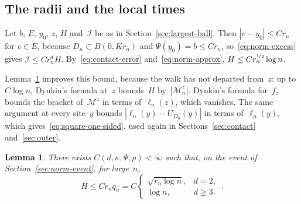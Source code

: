 \documentclass[11pt]{amsart}
\theoremstyle{plain}
\newtheorem{lemma}[theorem]{Lemma}
\theoremstyle{definition}
\newcommand{\drift}{\kappa}
\newcommand{\gauge}{\Psi}
\newcommand{\nf}{\nicefrac}
\numberwithin{equation}{section}
\begin{document}
\subsection{The radii and the local times}\label{sec:norm-inner}

Let $b$, $E$, $y_0$, $z$, $H$ and~$\mathcal I$ be as in Section~\ref{sec:largest-ball}. Then $|v-y_0|\leq Cr_n$ for $v\in E$, because $D_n\subset B(0,Kr_n)$ and $\gauge(y_0)=b\leq Cr_n$, so~\eqref{eq:norm-excess} gives $\mathcal I\leq Cr_n^dH$. By~\eqref{eq:contact-error} and~\eqref{eq:norm-approx}, $H\leq Cr_n^{\nf12}\log n$.

Lemma~\ref{lem:contact} improves this bound, because the walk has not departed from~$z$: up to $C\log n$, Dynkin's formula at~$z$ bounds~$H$ by~$|\mathcal M^z_n|$. Dynkin's formula for~$f_z$ bounds the bracket of~$\mathcal M^z$ in terms of~$\ell_n(z)$, which vanishes. The same argument at every site~$y$ bounds $|\ell_n(y)-U_{D_n}(y)|$ in terms of~$\ell_n(y)$, which gives~\eqref{eq:square-one-sided}, used again in Sections~\ref{sec:contact} and~\ref{sec:outer}.

\begin{lemma}\label{lem:contact}
There exists $C(d,\drift,\gauge,p)<\infty$ such that, on the event of Section~\ref{sec:norm-event}, for large~$n$,
\begin{equation*}
H\leq Cr_nq_n=C\begin{cases}\sqrt{r_n\log n},&d=2,\\\log n,&d\geq3\end{cases}\, .
\end{equation*}
\end{lemma}
\end{document}
